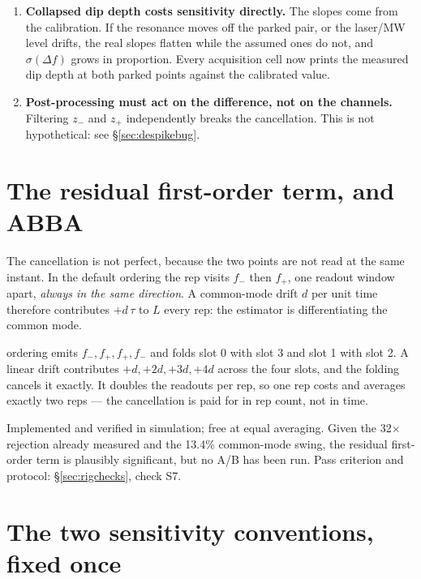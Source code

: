 \begin{enumerate}
  \item \textbf{Collapsed dip depth costs sensitivity directly.} The slopes come
  from the calibration. If the resonance moves off the parked pair, or the
  laser/MW level drifts, the real slopes flatten while the assumed ones do not,
  and $\sigma(\Delta f)$ grows in proportion. Every acquisition cell now prints
  the measured dip depth at both parked points against the calibrated value.
  \item \textbf{Post-processing must act on the difference, not on the channels.}
  Filtering $z_-$ and $z_+$ independently breaks the cancellation. This is not
  hypothetical: see \S\ref{sec:despikebug}.
\end{enumerate}

\section{The residual first-order term, and ABBA}
\label{sec:abba}

The cancellation is not perfect, because the two points are not read at the same
instant. In the default  ordering the rep visits $f_-$ then $f_+$,
one readout window apart, \emph{always in the same direction}. A common-mode
drift $d$ per unit time therefore contributes $+d\,\tau$ to $L$ every rep: the
estimator is differentiating the common mode.

 ordering emits $f_-, f_+, f_+, f_-$ and folds slot 0 with slot 3 and
slot 1 with slot 2. A linear drift contributes $+d, +2d, +3d, +4d$ across the
four slots, and the folding cancels it exactly. It doubles the readouts per rep,
so one  rep costs and averages exactly two  reps --- the
cancellation is paid for in rep count, not in time.

\begin{openbox}
Implemented and verified in simulation; free at equal averaging. Given the
32$\times$ rejection already measured and the 13.4\% common-mode swing, the
residual first-order term is plausibly significant, but no A/B has been run.
Pass criterion and protocol: \S\ref{sec:rigchecks}, check S7.
\end{openbox}

\section{The two sensitivity conventions, fixed once}
\label{sec:conventions}

